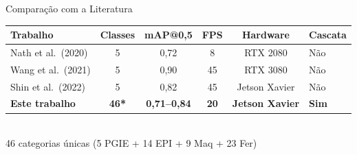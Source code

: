 \begin{frame}{Comparação com a Literatura}
  \vspace{-3mm}
  \begin{center}
    \renewcommand{\arraystretch}{1.2}
    \scriptsize
    \begin{tabular}{@{}lccccl@{}}
      \toprule
      \textbf{Trabalho} & \textbf{Classes} & \textbf{mAP@0,5} & \textbf{FPS} & \textbf{Hardware} & \textbf{Cascata} \\
      \midrule
      Nath et al.\ (2020) & 5 & 0,72 & 8 & RTX 2080 & Não \\
      Wang et al.\ (2021) & 5 & 0,90 & 45 & RTX 3080 & Não \\
      Shin et al.\ (2022) & 5 & 0,82 & 45 & Jetson Xavier & Não \\
      \rowcolor{headcolor!20}
      \textbf{Este trabalho} & \textcolor{headcolor}{\textbf{46*}} & \textbf{0,71--0,84} & \textcolor{headcolor}{\textbf{20}} & \textbf{Jetson Xavier} & \textcolor{headcolor}{\textbf{Sim}} \\
      \bottomrule
    \end{tabular}\\[1pt]
    {\tiny * 46 categorias únicas (5 PGIE + 14 EPI + 9 Maq + 23 Fer)}
  \end{center}

  \vspace{2mm}


\end{frame}

